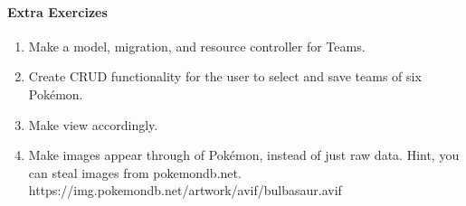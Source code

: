 \documentclass{article}
\begin{document}
\paragraph{Extra Exercizes}

\begin{enumerate}
    \item Make a model, migration, and resource controller for Teams.
    \item Create CRUD functionality for the user to select and save teams of six Pokémon.
    \item Make view accordingly.
    \item Make images appear through of Pokémon, instead of just raw data.
          Hint, you can steal images from pokemondb.net.
          https://img.pokemondb.net/artwork/avif/bulbasaur.avif
\end{enumerate}
\end{document}
